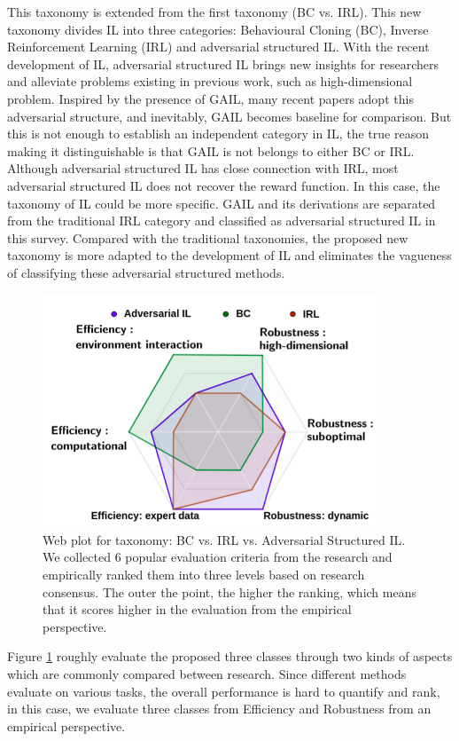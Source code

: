 \documentclass[acmsmall]{acmart}
\begin{document}
This taxonomy is extended from the first taxonomy (BC vs. IRL). This new taxonomy divides IL into three categories: Behavioural Cloning (BC), Inverse Reinforcement Learning (IRL) and adversarial structured IL. 
With the recent development of IL, adversarial structured IL brings new insights for researchers and alleviate problems existing in previous work, such as high-dimensional problem. Inspired by the presence of GAIL, many recent papers adopt this adversarial structure, and inevitably, GAIL becomes baseline for comparison. But this is not enough to establish an independent category in IL, the true reason making it distinguishable is that GAIL is not belongs to either BC or IRL. Although adversarial structured IL has close connection with IRL, most adversarial structured IL does not recover the reward function. In this case, the taxonomy of IL could be more specific. GAIL and its derivations are separated from the traditional IRL category and classified as adversarial structured IL in this survey. Compared with the traditional taxonomies, the proposed new taxonomy is more adapted to the development of IL and eliminates the vagueness of classifying these adversarial structured methods.
\begin{figure}[t]
      \centering
      \includegraphics[width=0.9\textwidth]{web_plot.png}
      \caption{Web plot for taxonomy: BC vs. IRL vs. Adversarial Structured IL. We collected 6 popular evaluation criteria from the research and empirically ranked them into three levels based on research consensus. The outer the point, the higher the ranking, which means that it scores higher in the evaluation from the empirical perspective.}
      \label{fig_newtax}
\end{figure}

Figure \ref{fig_newtax} roughly evaluate the proposed three classes through two kinds of aspects which are commonly compared between research. Since different methods evaluate on various tasks, the overall performance is hard to quantify and rank, in this case, we evaluate three classes from Efficiency and Robustness from an empirical perspective. 
\end{document}
